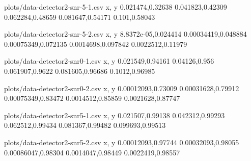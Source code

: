 \documentclass[a4paper, openany, oneside]{memoir}
\begin{document}



\begin{filecontents*}{plots/data-detector2-snr-5-1.csv}
x, y
0.021474,0.32638
0.041823,0.42309
0.062284,0.48659
0.081647,0.54171
0.101,0.58043
\end{filecontents*}
\begin{filecontents*}{plots/data-detector2-snr-5-2.csv}
x, y
8.8372e-05,0.024414
0.00034419,0.048884
0.00075349,0.072135
0.0014698,0.097842
0.0022512,0.11979
\end{filecontents*}
\begin{filecontents*}{plots/data-detector2-snr0-1.csv}
x, y
0.021549,0.94161
0.04126,0.956
0.061907,0.9622
0.081605,0.96686
0.1012,0.96985
\end{filecontents*}
\begin{filecontents*}{plots/data-detector2-snr0-2.csv}
x, y
0.00012093,0.73009
0.00031628,0.79912
0.00075349,0.83472
0.0014512,0.85859
0.0021628,0.87747
\end{filecontents*}
\begin{filecontents*}{plots/data-detector2-snr5-1.csv}
x, y
0.021507,0.99138
0.042312,0.99293
0.062512,0.99434
0.081367,0.99482
0.099693,0.99513
\end{filecontents*}
\begin{filecontents*}{plots/data-detector2-snr5-2.csv}
x, y
0.00012093,0.97744
0.00032093,0.98055
0.00086047,0.98304
0.0014047,0.98449
0.0022419,0.98557
\end{filecontents*}
\end{document}
